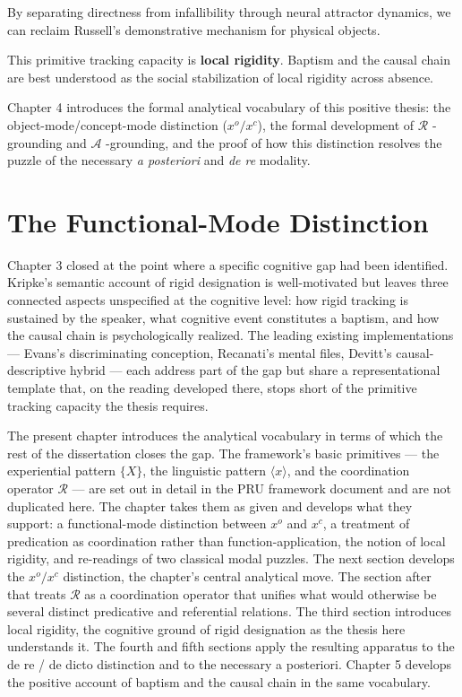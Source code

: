 \documentclass[12pt,a4paper]{article}
\begin{document}
By separating directness from infallibility through neural attractor dynamics, we can reclaim Russell's demonstrative mechanism for physical objects.

This primitive tracking capacity is \textbf{local rigidity}. Baptism and the causal chain are best understood as the social stabilization of local rigidity across absence.

Chapter 4 introduces the formal analytical vocabulary of this positive thesis: the object-mode/concept-mode distinction (\(x^o/x^c\)), the formal development of \(\mathcal{R}\) -grounding and \(\mathcal{A}\) -grounding, and the proof of how this distinction resolves the puzzle of the necessary \emph{a posteriori} and \emph{de re} modality.

\section{The Functional-Mode Distinction}\label{the-functional-mode-distinction}

Chapter 3 closed at the point where a specific cognitive gap had been identified. Kripke's semantic account of rigid designation is well-motivated but leaves three connected aspects unspecified at the cognitive level: how rigid tracking is sustained by the speaker, what cognitive event constitutes a baptism, and how the causal chain is psychologically realized. The leading existing implementations --- Evans's discriminating conception, Recanati's mental files, Devitt's causal-descriptive hybrid --- each address part of the gap but share a representational template that, on the reading developed there, stops short of the primitive tracking capacity the thesis requires.

The present chapter introduces the analytical vocabulary in terms of which the rest of the dissertation closes the gap. The framework's basic primitives --- the experiential pattern \(\{X\}\), the linguistic pattern \(\langle x \rangle\), and the coordination operator \(\mathcal{R}\) --- are set out in detail in the PRU framework document and are not duplicated here. The chapter takes them as given and develops what they support: a functional-mode distinction between \(x^o\) and \(x^c\), a treatment of predication as coordination rather than function-application, the notion of local rigidity, and re-readings of two classical modal puzzles. The next section develops the \(x^o/x^c\) distinction, the chapter's central analytical move. The section after that treats \(\mathcal{R}\) as a coordination operator that unifies what would otherwise be several distinct predicative and referential relations. The third section introduces local rigidity, the cognitive ground of rigid designation as the thesis here understands it. The fourth and fifth sections apply the resulting apparatus to the de re / de dicto distinction and to the necessary a posteriori. Chapter 5 develops the positive account of baptism and the causal chain in the same vocabulary.
\end{document}
